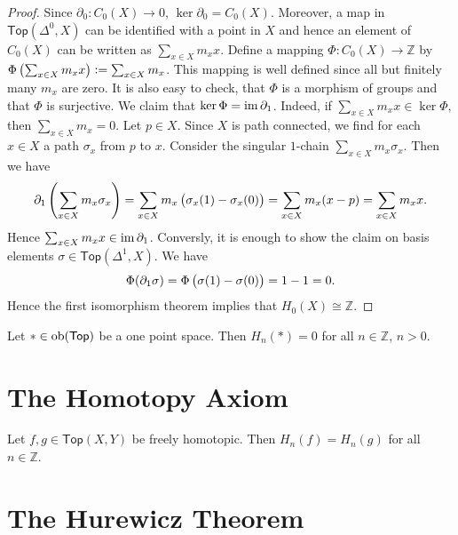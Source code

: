 \begin{proof}
	Since $\partial_0 : C_0(X) \to 0$, $\ker \partial_0 = C_0(X)$. Moreover, a map in $\mathsf{Top}(\Delta^0,X)$ can be identified with a point in $X$ and hence an element of $C_0(X)$ can be written as $\sum_{x \in X}m_x x$. Define a mapping $\Phi : C_0(X) \to \mathbb{Z}$ by $\Phi\del[1]{\sum_{x \in X}m_x x} := \sum_{x \in X}m_x$. This mapping is well defined since all but finitely many $m_x$ are zero. It is also easy to check, that $\Phi$ is a morphism of groups and that $\Phi$ is surjective. We claim that $\ker \Phi = \operatorname{im} \partial_1$. Indeed, if $\sum_{x \in X} m_x x \in \ker \Phi$, then $\sum_{x \in X}m_x = 0$. Let $p \in X$. Since $X$ is path connected, we find for each $x \in X$ a path $\sigma_x$ from $p$ to $x$. Consider the singular $1$-chain $\sum_{x \in X}m_x \sigma_x$. Then we have
	\begin{equation*}
		\partial_1 \del[4]{\sum_{x \in X}m_x \sigma_x} = \sum_{x \in X}m_x \del[1]{\sigma_x(1)- \sigma_x(0)} = \sum_{x \in X}m_x (x - p) = \sum_{x \in X} m_x x.
	\end{equation*}
	Hence $\sum_{x \in X}m_x x \in \operatorname{im} \partial_1$. Conversly, it is enough to show the claim on basis elements $\sigma \in \mathsf{Top}(\Delta^1,X)$. We have
	\begin{equation*}
		\Phi(\partial_1 \sigma) = \Phi\del[1]{\sigma(1) - \sigma(0)} = 1 - 1 = 0.
	\end{equation*}
	Hence the first isomorphism theorem \cite[23]{grillet:abstract_algebra:2007} implies that $H_0(X) \cong \mathbb{Z}$.
\end{proof}

\begin{proposition}
	Let $\ast \in \operatorname{ob}(\mathsf{Top})$ be a one point space. Then $H_n(\ast) = 0$ for all $n \in \mathbb{Z}$, $n > 0$.
\end{proposition}

\section*{The Homotopy Axiom}

\begin{theorem}
	Let $f,g \in \mathsf{Top}(X,Y)$ be freely homotopic. Then $H_n(f) = H_n(g)$ for all $n \in \mathbb{Z}$.
\end{theorem}

\section*{The Hurewicz Theorem}
